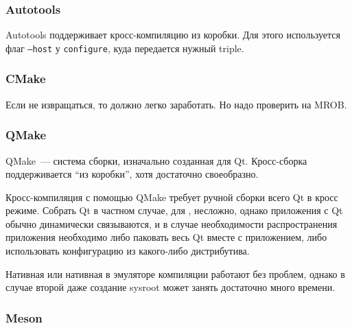 \subsubsection{Autotools}
Autotools поддерживает кросс-компиляцию из коробки.
Для этого используется флаг \texttt{--host} у \texttt{configure}, куда передается нужный triple.


\subsubsection{CMake}

Если не извращаться, то должно легко заработать.
Но надо проверить на MROB.

\subsubsection{QMake}

QMake~--- система сборки, изначально созданная для Qt.
Кросс-сборка поддерживается \enquote{из коробки}, хотя достаточно своеобразно.

Кросс-компиляция с помощью QMake требует ручной сборки всего Qt в кросс режиме.
Собрать Qt в частном случае, для \ci{}, несложно, однако приложения с Qt обычно динамически связываются, и в случае необходимости распространения приложения необходимо либо паковать весь Qt вместе с приложением, либо использовать конфигурацию из какого-либо дистрибутива.

Нативная или нативная в эмуляторе компиляции работают без проблем, однако в случае второй даже создание sysroot может занять достаточно много времени.

\subsubsection{Meson}

